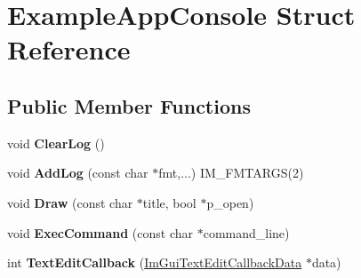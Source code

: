 \hypertarget{struct_example_app_console}{}\section{Example\+App\+Console Struct Reference}
\label{struct_example_app_console}
\subsection*{Public Member Functions}
\begin{DoxyCompactItemize}
\item 
\mbox{\label{struct_example_app_console_a2ef13f00c474b16b8da2ec062d5e5cc2}} 
void {\bfseries Clear\+Log} ()
\item 
\mbox{\label{struct_example_app_console_a719354ce6be7481923a5fd702e785952}} 
void {\bfseries Add\+Log} (const char $\ast$fmt,...) I\+M\+\_\+\+F\+M\+T\+A\+R\+GS(2)
\item 
\mbox{\label{struct_example_app_console_a0518a09c7e8648dd52c7c06df19ac17a}} 
void {\bfseries Draw} (const char $\ast$title, bool $\ast$p\+\_\+open)
\item 
\mbox{\label{struct_example_app_console_aa1e8bf1f3795cbc41597e1ff081c6589}} 
void {\bfseries Exec\+Command} (const char $\ast$command\+\_\+line)
\item 
\mbox{\label{struct_example_app_console_aae97c81ddab660e6e0296c21844c4a7b}} 
int {\bfseries Text\+Edit\+Callback} (\hyperlink{struct_im_gui_text_edit_callback_data}{Im\+Gui\+Text\+Edit\+Callback\+Data} $\ast$data)
\end{DoxyCompactItemize}
